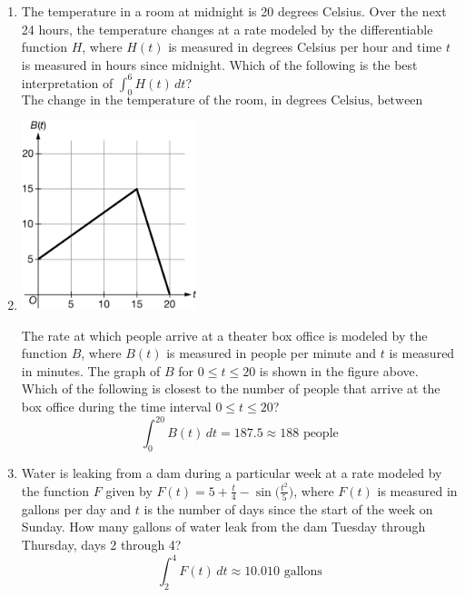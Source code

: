 \documentclass[12pt]{article}
\begin{document}
\begin{enumerate}
\begin{enumerate}
    \item The temperature in a room at midnight is 20 degrees Celsius. Over the next 24 hours, the temperature changes at a rate modeled by the differentiable function $H$, where $H(t)$ is measured in degrees Celsius per hour and time $t$ is measured in hours since midnight. Which of the following is the best interpretation of $\int_{0}^{6} H(t) \, dt$?
$$\boxed{\text{The change in the temperature of the room, in degrees Celsius, between midnight and 06:00}}$$
    \item 
    \begin{center}
        \includegraphics[width=2in]{4.051.png}
    \end{center}
    The rate at which people arrive at a theater box office is modeled by the function $B$, where $B(t)$ is measured in people per minute and $t$ is measured in minutes. The graph of $B$ for $0 \leq t \leq 20$ is shown in the figure above. Which of the following is closest to the number of people that arrive at the box office during the time interval $0 \leq t \leq 20$?
    $$\int_{0}^{20} B(t) \, dt = 187.5 \approx \boxed{188\text{ people}}$$

    \item Water is leaking from a dam during a particular week at a rate modeled by the function $F$ given by $F(t)=5+\frac{t}{4}-\sin \big(\frac{t^2}{5}\big)$, where $F(t)$ is measured in gallons per day and $t$ is the number of days since the start of the week on Sunday. How many gallons of water leak from the dam Tuesday through Thursday, days 2 through 4?
    $$\int_{2}^{4} F(t) \, dt \approx \boxed{10.010 \text{ gallons}}$$


\end{enumerate}
\end{enumerate}
\end{document}
